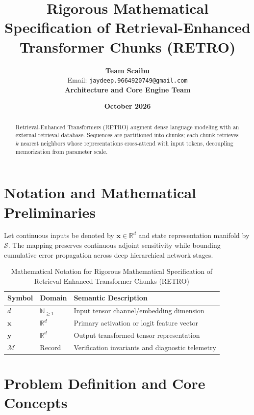 \documentclass[11pt,a4paper]{article}
\title{\textbf{Rigorous Mathematical Specification of Retrieval-Enhanced Transformer Chunks (RETRO)}}
\author{\textbf{Team Scaibu} \\ \small Email: \texttt{jaydeep.9664920749@gmail.com} \\ \small \textbf{Architecture and Core Engine Team}}
\date{\textbf{October 2026}}
\theoremstyle{definition}
\begin{document}
\maketitle

\begin{abstract}
Retrieval-Enhanced Transformers (RETRO) augment dense language modeling with an external retrieval database. Sequences are partitioned into chunks; each chunk retrieves $k$ nearest neighbors whose representations cross-attend with input tokens, decoupling memorization from parameter scale.
\end{abstract}

\section{Notation and Mathematical Preliminaries}

Let continuous inputs be denoted by $\mathbf{x} \in \mathbb{R}^d$ and state representation manifold by $\mathcal{S}$. The mapping preserves continuous adjoint sensitivity while bounding cumulative error propagation across deep hierarchical network stages.

\begin{table}[h]
\centering
\caption{Mathematical Notation for Rigorous Mathematical Specification of Retrieval-Enhanced Transformer Chunks (RETRO)}
\begin{tabular}{lll}
\toprule
\textbf{Symbol} & \textbf{Domain} & \textbf{Semantic Description} \\
\midrule
$d$ & $\mathbb{N}_{\ge 1}$ & Input tensor channel/embedding dimension \\
$\mathbf{x}$ & $\mathbb{R}^d$ & Primary activation or logit feature vector \\
$\mathbf{y}$ & $\mathbb{R}^d$ & Output transformed tensor representation \\
$\mathcal{M}$ & Record & Verification invariants and diagnostic telemetry \\
\bottomrule
\end{tabular}
\end{table}

\section{Problem Definition and Core Concepts}
\end{document}
